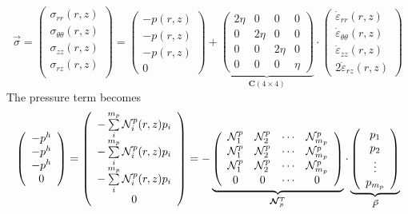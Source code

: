 \[
\vec{\sigma}=
\left(
\begin{array}{c}
\sigma_{rr}(r,z) \\
\sigma_{\theta\theta}(r,z) \\
\sigma_{zz}(r,z) \\
\sigma_{rz}(r,z) \\
\end{array}
\right)
=
\left(
\begin{array}{c}
-p(r,z) \\ -p(r,z) \\ -p(r,z) \\ 0
\end{array}
\right)+
\underbrace{
\left(
\begin{array}{cccc}
2\eta & 0 & 0 & 0  \\
0& 2\eta & 0& 0  \\
0 & 0 & 2\eta & 0  \\
0 & 0 & 0 & \eta
\end{array}
\right)
}_{{\bm C}(4 \times 4)}
\cdot
\left(
\begin{array}{c}
\dot\varepsilon_{rr}(r,z) \\
\dot\varepsilon_{\theta\theta}(r,z) \\
\dot\varepsilon_{zz}(r,z) \\
2\dot\varepsilon_{rz}(r,z) 
\end{array}
\right)
\]
The pressure term becomes
\[
\left(
\begin{array}{c}
-p^h \\ -p^h \\ -p^h \\ 0
\end{array}
\right)
=
\left(
\begin{array}{c}
-\sum\limits_i^{m_p} {\mathcal{N}}_i^p(r,z) p_i \\
-\sum\limits_i^{m_p} {\mathcal{N}}_i^p(r,z) p_i \\ 
-\sum\limits_i^{m_p} {\mathcal{N}}_i^p(r,z) p_i \\ 
0
\end{array}
\right)
=
-
\underbrace{
\left(
\begin{array}{cccc}
{\mathcal{N}}_1^p & {\mathcal{N}}_2^p & \cdots & {\mathcal{N}}_{m_p}^p \\
{\mathcal{N}}_1^p & {\mathcal{N}}_2^p & \cdots & {\mathcal{N}}_{m_p}^p \\
{\mathcal{N}}_1^p & {\mathcal{N}}_2^p & \cdots & {\mathcal{N}}_{m_p}^p \\
0 & 0 & \cdots & 0
\end{array}
\right)
}_{{\bm {{\mathcal{N}}}}_p^T}
\cdot
\underbrace{
\left(
\begin{array}{c}
p_1 \\ p_2 \\ \vdots \\ p_{m_p}
\end{array}
\right)
}_{\vec{P}}
\]
